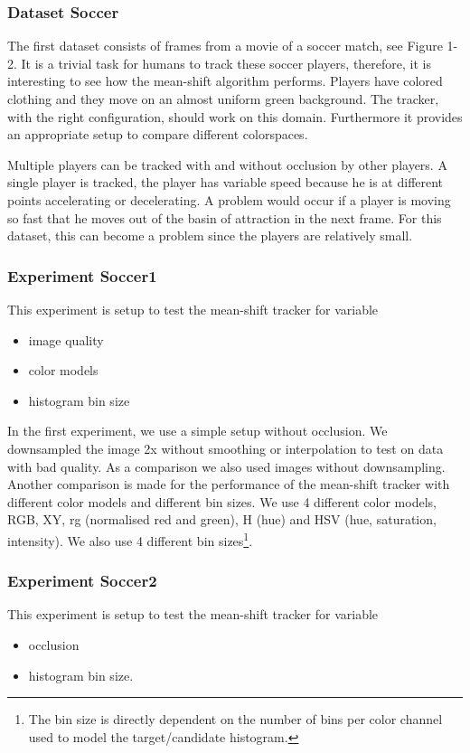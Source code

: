 \documentclass[a4paper,11pt]{article}
\begin{document}
\subsubsection{Dataset Soccer}
The first dataset consists of frames from a movie of a soccer match, see Figure 1-2. It is a trivial task for 
humans to track these soccer players, therefore, it is interesting to see how the mean-shift algorithm performs.  
Players have colored clothing and they move on an almost uniform green background. The tracker, with the right configuration, should work on this domain. Furthermore it provides an appropriate setup to compare different colorspaces.

Multiple players can be tracked with and without occlusion by other players. A single player is tracked, the player has variable speed because he is at
different points accelerating or decelerating. A problem would occur if a
player is moving so fast that he moves out of the basin of attraction in the
next frame. For this dataset, this can become a problem since the players are
relatively small.




\subsubsection{Experiment Soccer1}
This experiment is setup to test the mean-shift tracker for variable
\begin{itemize}
\item image quality
\item color models
\item histogram bin size
 \end{itemize}

In the first experiment, we use a simple setup without occlusion. We downsampled
the image 2x without smoothing or interpolation to test on data with bad
quality. As a comparison we also used images without downsampling. Another comparison is made for the performance of the mean-shift tracker with different color models
and different bin sizes.  We use 4 different color models, RGB, XY, rg
(normalised red and green), H (hue) and HSV (hue, saturation, intensity). We
also use 4 different bin sizes\footnote{The bin size is directly dependent on  the number of bins
per color channel used to model the target/candidate histogram.}.

\subsubsection{Experiment Soccer2}
This experiment is setup to test the mean-shift tracker for variable
\begin{itemize}
\item occlusion
\item histogram bin size.
\end{itemize}
\end{document}
